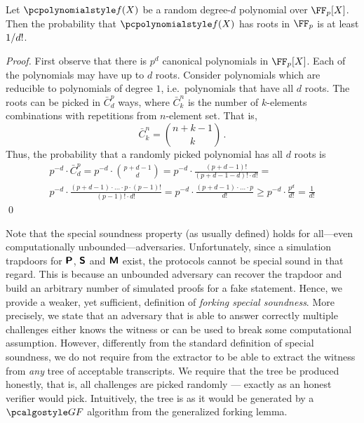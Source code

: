 \begin{lemma}
  \label{lem:root_prob}
  Let $\p{f}(X)$ be a random degree-$d$ polynomial over $\FF_p[X]$. Then the
  probability that $\p{f}(X)$ has roots in $\FF_p$ is at least $1 / d!$.
\end{lemma}
\begin{proof}
  First observe that there is $p^{d}$ canonical polynomials in $\FF_p[X]$.  Each
  of the polynomials may have up to $d$ roots. Consider polynomials which are
  reducible to polynomials of degree $1$, i.e.~polynomials that have all $d$
  roots. The roots can be picked in $\bar{C}^{p}_{d}$ ways, where
  $\bar{C}^{n}_{k}$ is the number of $k$-elements combinations with repetitions
  from $n$-element set. That is,
  \[
    \bar{C}^n_k = \binom{n + k - 1}{k}\,.
  \]
  Thus, the probability that a randomly picked polynomial has all $d$ roots is
  \begin{multline*}
    p^{-d} \cdot \bar{C}^p_d = p^{-d} \cdot \binom{p + d - 1}{d} =
    p^{-d} \cdot \frac{(p + d - 1)!}{(p + d - 1 - d)! \cdot d!} = \\
    p^{-d} \cdot \frac{(p + d - 1) \cdot \ldots \cdot p \cdot (p - 1)!}{(p - 1)!
      \cdot d!} = p^{-d} \cdot \frac{(p + d - 1)\cdot
      \ldots \cdot p}{d!}
    \geq p^{-d} \cdot {\frac{p^d}{d!}} = \frac{1}{d!}
  \end{multline*}
  \qed
\end{proof}


Note that the special soundness property (as usually defined) holds for
all---even computationally unbounded---adversaries. Unfortunately, since a
simulation trapdoors for $\bm{\mathsf{P}}$, $\bm{\mathsf{S}}$ and $\bm{\mathsf{M}}$ exist, the protocols
cannot be special sound in that regard. This is because an unbounded adversary
can recover the trapdoor and build an arbitrary number of simulated proofs for a fake
statement. Hence, we provide a weaker, yet sufficient, definition of
\emph{forking special soundness}. More precisely, we state that an
adversary that is able to answer correctly multiple challenges either knows the
witness or can be used to break some computational assumption.
However, differently from the standard definition of special soundness, we do
not require from the extractor to be able to extract the witness from \emph{any}
tree of acceptable transcripts. We require that the tree be produced honestly,
that is, all challenges are picked randomly --- exactly as an honest verifier would pick.
Intuitively, the tree is as it would be generated by a $\genforking$
algorithm from the generalized forking lemma.


